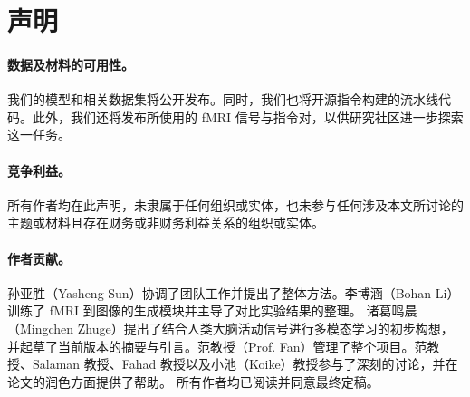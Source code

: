 \section{声明}

\paragraph{数据及材料的可用性。}
我们的模型和相关数据集将公开发布。同时，我们也将开源指令构建的流水线代码。此外，我们还将发布所使用的 fMRI 信号与指令对，以供研究社区进一步探索这一任务。

\paragraph{竞争利益。}
所有作者均在此声明，未隶属于任何组织或实体，也未参与任何涉及本文所讨论的主题或材料且存在财务或非财务利益关系的组织或实体。

\paragraph{作者贡献。}
孙亚胜（Yasheng Sun）协调了团队工作并提出了整体方法。李博涵（Bohan Li）训练了 fMRI 到图像的生成模块并主导了对比实验结果的整理。
诸葛鸣晨（Mingchen Zhuge）提出了结合人类大脑活动信号进行多模态学习的初步构想，并起草了当前版本的摘要与引言。范教授（Prof. Fan）管理了整个项目。范教授、Salaman 教授、Fahad 教授以及小池（Koike）教授参与了深刻的讨论，并在论文的润色方面提供了帮助。
所有作者均已阅读并同意最终定稿。

